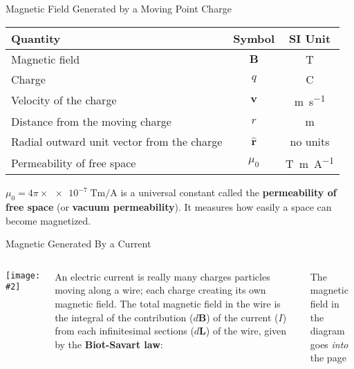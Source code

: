 \documentclass[12pt,aspectratio=169]{beamer}
\newcommand{\pic}[2]{\texttt{[image: \#2]}}
\newcommand{\mb}[1]{\mathbf{#1}}
\newcommand{\eq}[2]{\vspace{#1}{\Large\begin{displaymath}#2\end{displaymath}}}
\begin{document}
\begin{frame}{Magnetic Field Generated by a Moving Point Charge}

  \eq{-.1in}{
    \boxed{\mb{B}=\frac{\mu_0}{4\pi}\frac{q\mb{v}\times\hat{\mb{r}}}{r^2}}
  }
  \begin{center}
    \begin{tabular}{l|c|c}
      \rowcolor{pink}
      \textbf{Quantity} & \textbf{Symbol} & \textbf{SI Unit} \\ \hline
      Magnetic field                  & $\mb{B}$ & \si{\tesla}\\
      Charge                          & $q$      & \si{\coulomb}\\
      Velocity of the charge          & $\mb{v}$ & \si{\metre\per\second}\\
      Distance from the moving charge & $r$      & \si{\metre}\\
      Radial outward unit vector from the charge & $\hat{\mb{r}}$ & no units\\
      Permeability of free space & $\mu_0$ & \si{\tesla\metre\per\ampere}
    \end{tabular}
  \end{center}
  $\mu_0=4\pi\times\num{e-7}\;\si{\tesla\metre\per\ampere}$ is a universal
  constant called the \textbf{permeability of free space} (or
  \textbf{vacuum permeability}). It measures how easily a space can become
  magnetized.
\end{frame}



\begin{frame}{Magnetic Generated By a Current}
  \begin{columns}
    \pic{1}{bsav}
    
    An electric current is really many charges particles moving along a wire;
    each charge creating its own magnetic field.
    The total magnetic field in the wire is the integral of the contribution
    ($d\mb{B}$) of the current ($I$) from each infinitesimal sections
    ($d\mb{L}$) of the wire, given by the \textbf{Biot-Savart law}:
  
    \eq{-.2in}{
      \boxed{d\mb{B}=\frac{\mu_0}{4\pi}\frac{Id\mb{L}\times\hat{\mb{r}}}{r^2}}
    }

    The magnetic field in the diagram goes \emph{into} the page
  \end{columns}
\end{frame}
\end{document}
